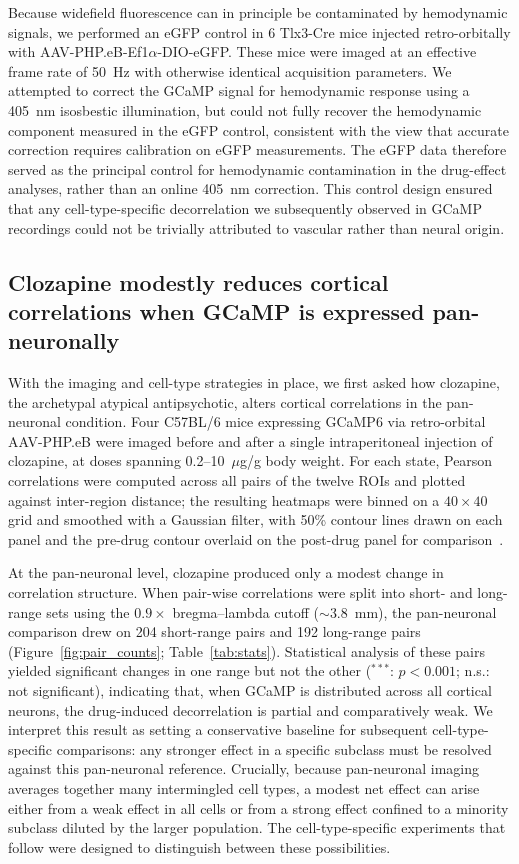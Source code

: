 \documentclass[11pt]{article}
\begin{document}
Because widefield fluorescence can in principle be contaminated by hemodynamic signals, we performed an eGFP control in 6 Tlx3-Cre mice injected retro-orbitally with AAV-PHP.eB-Ef1$\alpha$-DIO-eGFP. These mice were imaged at an effective frame rate of 50~Hz with otherwise identical acquisition parameters. We attempted to correct the GCaMP signal for hemodynamic response using a 405~nm isosbestic illumination, but could not fully recover the hemodynamic component measured in the eGFP control, consistent with the view that accurate correction requires calibration on eGFP measurements. The eGFP data therefore served as the principal control for hemodynamic contamination in the drug-effect analyses, rather than an online 405~nm correction. This control design ensured that any cell-type-specific decorrelation we subsequently observed in GCaMP recordings could not be trivially attributed to vascular rather than neural origin.

\subsection{Clozapine modestly reduces cortical correlations when GCaMP is expressed pan-neuronally}

With the imaging and cell-type strategies in place, we first asked how clozapine, the archetypal atypical antipsychotic, alters cortical correlations in the pan-neuronal condition. Four C57BL/6 mice expressing GCaMP6 via retro-orbital AAV-PHP.eB were imaged before and after a single intraperitoneal injection of clozapine, at doses spanning 0.2--10~$\mu$g/g body weight. For each state, Pearson correlations were computed across all pairs of the twelve ROIs and plotted against inter-region distance; the resulting heatmaps were binned on a $40\times40$ grid and smoothed with a Gaussian filter, with 50\% contour lines drawn on each panel and the pre-drug contour overlaid on the post-drug panel for comparison~\citep{dombeck2007imaging, saravanan2020hierarchical}.

At the pan-neuronal level, clozapine produced only a modest change in correlation structure. When pair-wise correlations were split into short- and long-range sets using the $0.9\times$ bregma--lambda cutoff ($\sim$3.8~mm), the pan-neuronal comparison drew on 204 short-range pairs and 192 long-range pairs (Figure~\ref{fig:pair_counts}; Table~\ref{tab:stats}). Statistical analysis of these pairs yielded significant changes in one range but not the other ($^{***}$: $p<0.001$; n.s.: not significant), indicating that, when GCaMP is distributed across all cortical neurons, the drug-induced decorrelation is partial and comparatively weak. We interpret this result as setting a conservative baseline for subsequent cell-type-specific comparisons: any stronger effect in a specific subclass must be resolved against this pan-neuronal reference. Crucially, because pan-neuronal imaging averages together many intermingled cell types, a modest net effect can arise either from a weak effect in all cells or from a strong effect confined to a minority subclass diluted by the larger population. The cell-type-specific experiments that follow were designed to distinguish between these possibilities.
\end{document}
